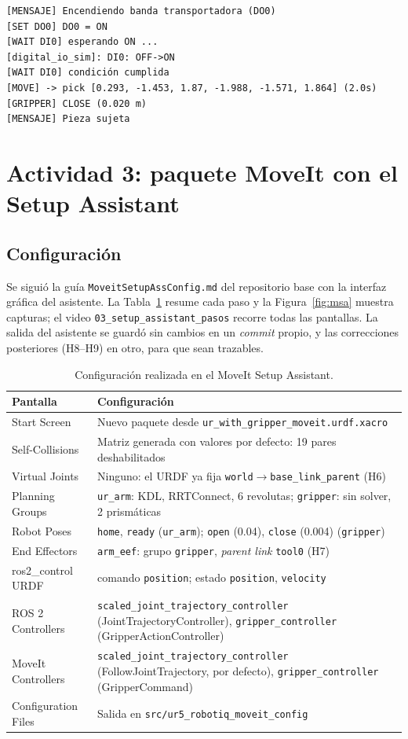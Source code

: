 \documentclass[11pt,letterpaper]{article}
\begin{document}
\begin{lstlisting}
[MENSAJE] Encendiendo banda transportadora (DO0)
[SET DO0] DO0 = ON
[WAIT DI0] esperando ON ...
[digital_io_sim]: DI0: OFF->ON
[WAIT DI0] condición cumplida
[MOVE] -> pick [0.293, -1.453, 1.87, -1.988, -1.571, 1.864] (2.0s)
[GRIPPER] CLOSE (0.020 m)
[MENSAJE] Pieza sujeta
\end{lstlisting}

\section{Actividad 3: paquete MoveIt con el Setup Assistant}

\subsection{Configuración}
Se siguió la guía \texttt{MoveitSetupAssConfig.md} del repositorio base con la interfaz gráfica del asistente. La Tabla~\ref{tab:msa} resume cada paso y la Figura~\ref{fig:msa} muestra capturas; el video \texttt{03\_setup\_assistant\_pasos} recorre todas las pantallas. La salida del asistente se guardó sin cambios en un \emph{commit} propio, y las correcciones posteriores (H8--H9) en otro, para que sean trazables.

\begin{table}[H]
\centering
\caption{Configuración realizada en el MoveIt Setup Assistant.}
\label{tab:msa}
\begin{tabularx}{\linewidth}{@{}l X@{}}
\toprule
Pantalla & Configuración \\
\midrule
Start Screen & Nuevo paquete desde \texttt{ur\_with\_gripper\_moveit.urdf.xacro} \\
Self-Collisions & Matriz generada con valores por defecto: 19 pares deshabilitados \\
Virtual Joints & Ninguno: el URDF ya fija \texttt{world}$\rightarrow$\texttt{base\_link\_parent} (H6) \\
Planning Groups & \texttt{ur\_arm}: KDL, RRTConnect, 6 revolutas; \texttt{gripper}: sin solver, 2 prismáticas \\
Robot Poses & \texttt{home}, \texttt{ready} (\texttt{ur\_arm}); \texttt{open} (0.04), \texttt{close} (0.004) (\texttt{gripper}) \\
End Effectors & \texttt{arm\_eef}: grupo \texttt{gripper}, \emph{parent link} \texttt{tool0} (H7) \\
ros2\_control URDF & comando \texttt{position}; estado \texttt{position}, \texttt{velocity} \\
ROS 2 Controllers & \texttt{scaled\_joint\_trajectory\_controller} (JointTrajectoryController), \texttt{gripper\_controller} (GripperActionController) \\
MoveIt Controllers & \texttt{scaled\_joint\_trajectory\_controller} (FollowJointTrajectory, por defecto), \texttt{gripper\_controller} (GripperCommand) \\
Configuration Files & Salida en \texttt{src/ur5\_robotiq\_moveit\_config} \\
\bottomrule
\end{tabularx}
\end{table}
\end{document}
